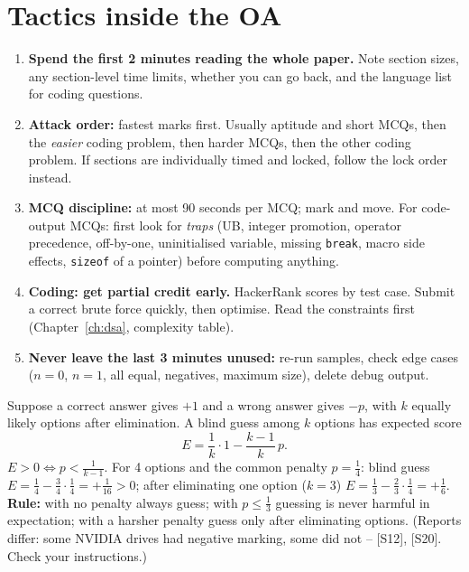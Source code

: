 \documentclass[10pt,a4paper,openany,oneside]{report}
\newcommand{\prio}[1]{\texorpdfstring{\ifcase#1\or{\color{gold}\ding{72}}\or{\color{gold}\ding{72}\ding{72}}\or{\color{gold}\ding{72}\ding{72}\ding{72}}\fi}{}}
\begin{document}
\section{Tactics inside the OA \prio{3}}
\begin{enumerate}
\item \textbf{Spend the first 2 minutes reading the whole paper.} Note section sizes, any section-level time limits, whether you can go back, and the
 language list for coding questions.
\item \textbf{Attack order:} fastest marks first. Usually aptitude and short MCQs, then the \emph{easier} coding problem, then harder MCQs, then the other coding problem.
 If sections are individually timed and locked, follow the lock order instead.
\item \textbf{MCQ discipline:} at most 90 seconds per MCQ; mark and move. For code-output MCQs: first look for \emph{traps} (UB, integer promotion, operator precedence,
 off-by-one, uninitialised variable, missing \texttt{break}, macro side effects, \texttt{sizeof} of a pointer) before computing anything.
\item \textbf{Coding: get partial credit early.} HackerRank scores by test case. Submit a correct brute force quickly, then optimise. Read the constraints first
 (Chapter~\ref{ch:dsa}, complexity table).
\item \textbf{Never leave the last 3 minutes unused:} re-run samples, check edge cases ($n=0$, $n=1$, all equal, negatives, maximum size), delete debug output.
\end{enumerate}

\begin{defbox}
Suppose a correct answer gives $+1$ and a wrong answer gives $-p$, with $k$ equally likely options after elimination. A blind guess among $k$ options has expected score
\[
E = \frac{1}{k}\cdot 1 - \frac{k-1}{k}\,p .
\]
$E>0 \iff p < \tfrac{1}{k-1}$. For 4 options and the common penalty $p=\tfrac14$: blind guess $E=\tfrac14-\tfrac34\cdot\tfrac14=+\tfrac1{16}>0$;
after eliminating one option ($k=3$) $E=\tfrac13-\tfrac23\cdot\tfrac14=+\tfrac16$. \textbf{Rule:} with no penalty always guess; with $p\le\tfrac13$ guessing is never harmful in
expectation; with a harsher penalty guess only after eliminating options. (Reports differ: some NVIDIA drives had negative marking, some did not --
[S12], [S20]. Check your instructions.)
\end{defbox}
\end{document}
